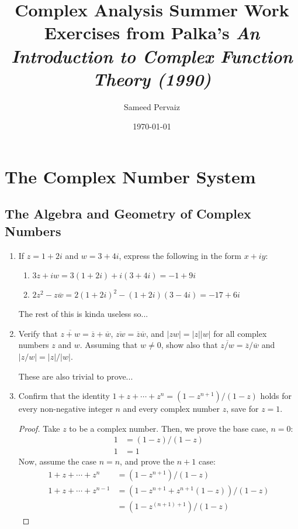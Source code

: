 \documentclass[11pt, a4paper, latinreim, shortsets]{notes}
\title{Complex Analysis Summer Work \\
\large Exercises from Palka's \emph{An Introduction to Complex Function Theory (1990)}}
\author{Sameed Pervaiz}
\date{\today}
\begin{document}
\maketitle

\chapter{The Complex Number System}

\section{The Algebra and Geometry of Complex Numbers}
\begin{enumerate}[label={\bfseries I.4.\arabic*}]
	\item If $z=1+2i$ and $w=3+4i$, express the following in the form $x+iy$:
	\begin{enumerate}
		\item $3z+iw = 3(1+2i) + i(3+4i) = -1 + 9i$ \\
		\item $2z^2-z\overline{w} = 2(1+2i)^2 - (1+2i)(3-4i) = -17 + 6i$ \\
	\end{enumerate}
	
	The rest of this is kinda useless so...


	\item Verify that $\overline{z+w} = \overline{z} + \overline{w}$, $\overline{zw} =
	\overline{z}\overline{w}$, and $|zw|=|z||w|$ for all complex numbers $z$ and $w$. Assuming that
	$w \neq 0$, show also that $\overline{z/w}=\overline{z}/\overline{w}$ and $|z/w|=|z|/|w|$.

	These are also trivial to prove...

	\item Confirm that the identity $1+z+\cdots+z^n = (1-z^{n+1})/(1-z)$ holds for every non-negative
	integer $n$ and every complex number $z$, save for $z=1$.

	\begin{proof}
		Take $z$ to be a complex number. Then, we prove the base case, $n=0:$
		\begin{align}
			1 &= (1-z)/(1-z) \\
			1 &= 1
		\end{align}
		Now, assume the case $n=n$, and prove the $n+1$ case:
		\begin{align}
			1 + z + \cdots + z^n &= (1-z^{n+1})/(1-z) \\
			1 + z + \cdots + z^{n-1} &= (1-z^{n+1} + z^{n+1}(1-z))/(1-z) \\
			&= (1-z^{(n+1)+1})/(1-z)
		\end{align}
	\end{proof}


\end{enumerate}
\end{document}
